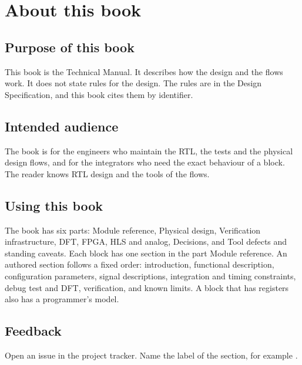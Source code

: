 \chapter*{About this book}
{}
\label{tm:ch:about}

\section*{Purpose of this book}
This book is the Technical Manual. It describes how the design and the flows work. It does not state rules for the design. The rules are in the Design Specification, and this book cites them by identifier.


\section*{Intended audience}
The book is for the engineers who maintain the RTL, the tests and the physical design flows, and for the integrators who need the exact behaviour of a block. The reader knows RTL design and the tools of the flows.

\section*{Using this book}
The book has six parts: Module reference, Physical design, Verification infrastructure, DFT, FPGA, HLS and analog, Decisions, and Tool defects and standing caveats. Each block has one section in the part Module reference. An authored section follows a fixed order: introduction, functional description, configuration parameters, signal descriptions, integration and timing constraints, debug test and DFT, verification, and known limits. A block that has registers also has a programmer's model.



\section*{Feedback}
Open an issue in the project tracker. Name the label of the section, for example .
